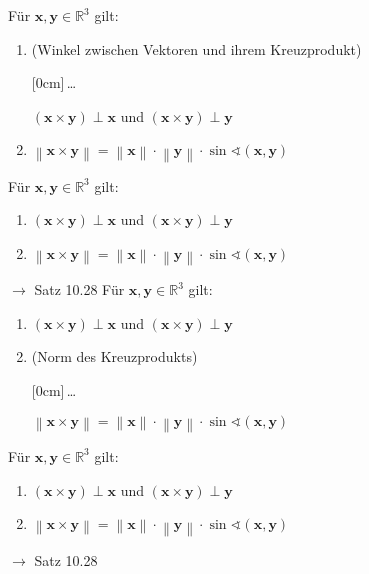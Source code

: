 \documentclass[11pt]{article}
\renewcommand{\cite}[1]{\par\bigskip\hfill{\color{gray}\tiny\(\to\) #1}}
\newcommand{\RR}{\mathbb{R}}
\newcommand*{\norm}[1]{\left\|#1\right\|}
\renewcommand{\vec}[1]{\mathbf{#1}}
\newcommand{\hide}[1]{\parbox{0cm}{\raisebox{-7pt}[0cm]{\dots}}\color{white}#1\color{black}}
\newcommand{\hint}[1]{{\color{lightgray}(#1)}}
\let\olddots\dots
\renewcommand{\dots}{\,\olddots\,}
\newenvironment{field}{}{\newpage}
\newif\ifnote
\newenvironment{note}{\notetrue}{\notefalse}
\newcommand{\localtag}{}
\newcommand{\globaltag}{}
\newcommand{\uuid}{}
\newcommand{\tags}[1]{
    \ifnote
        \renewcommand{\localtag}{#1}
    \else
        \renewcommand{\globaltag}{#1}
    \fi
    }
\newcommand{\xplain}[1]{\renewcommand{\uuid}{#1}}
\begin{document}
\begin{note}
    \tags{Satz}
    \xplain{47c00c10-bdd0-11ec-9d64-0242ac120002}

    \begin{field}
        Für \(\vec{x, y}\in\RR^3\) gilt:
        \begin{enumerate}
            \item \hint{Winkel zwischen Vektoren und ihrem Kreuzprodukt} \hide{\((\vec{x}\times\vec{y})\perp\vec{x}\) und
                  \((\vec{x}\times\vec{y})\perp\vec{y}\)}
            \item \(\norm{\vec{x}\times\vec{y}} =
                    \norm{\vec{x}}\cdot\norm{\vec{y}}
                    \cdot \sin\sphericalangle(\vec{x,y})\)
        \end{enumerate}
    \end{field}
    \begin{field}
        Für \(\vec{x, y}\in\RR^3\) gilt:
        \begin{enumerate}
            \item \((\vec{x}\times\vec{y})\perp\vec{x}\) und
                  \((\vec{x}\times\vec{y})\perp\vec{y}\)
            \item \(\norm{\vec{x}\times\vec{y}} =
                    \norm{\vec{x}}\cdot\norm{\vec{y}}
                    \cdot \sin\sphericalangle(\vec{x,y})\)
        \end{enumerate}
        \cite{Satz 10.28}
    \end{field}
    \begin{field}
        Für \(\vec{x, y}\in\RR^3\) gilt:
        \begin{enumerate}
            \item \((\vec{x}\times\vec{y})\perp\vec{x}\) und
                  \((\vec{x}\times\vec{y})\perp\vec{y}\)
            \item \hint{Norm des Kreuzprodukts} \hide{\(\norm{\vec{x}\times\vec{y}} =
                    \norm{\vec{x}}\cdot\norm{\vec{y}}
                    \cdot \sin\sphericalangle(\vec{x,y})\)}
        \end{enumerate}
    \end{field}
    \begin{field}
        Für \(\vec{x, y}\in\RR^3\) gilt:
        \begin{enumerate}
            \item \((\vec{x}\times\vec{y})\perp\vec{x}\) und
                  \((\vec{x}\times\vec{y})\perp\vec{y}\)
            \item \(\norm{\vec{x}\times\vec{y}} =
                    \norm{\vec{x}}\cdot\norm{\vec{y}}
                    \cdot \sin\sphericalangle(\vec{x,y})\)
        \end{enumerate}
        \cite{Satz 10.28}
    \end{field}
\end{note}
\end{document}
